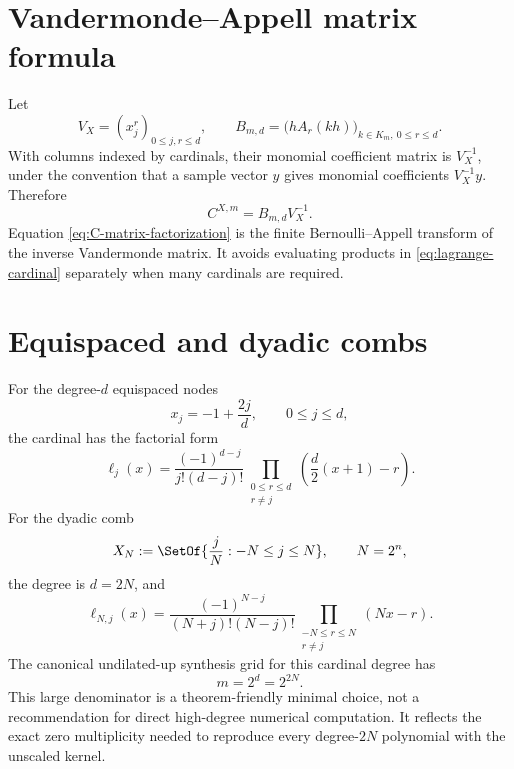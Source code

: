 \documentclass[11pt,oneside]{book}
\theoremstyle{definition}
\theoremstyle{remark}
\begin{document}
\section{Vandermonde--Appell matrix formula}
Let
\begin{equation}
 V_X=(x_j^r)_{0\le j,r\le d},
 \qquad
 B_{m,d}=\bigl(hA_r(kh)\bigr)_{k\in K_m,\ 0\le r\le d}.
 \label{eq:V-B-matrices}
\end{equation}
With columns indexed by cardinals, their monomial coefficient matrix is \(V_X^{-1}\), under the convention that a sample vector \(y\) gives monomial coefficients \(V_X^{-1}y\).  Therefore
\begin{equation}
 C^{X,m}=B_{m,d}V_X^{-1}.
 \label{eq:C-matrix-factorization}
\end{equation}
Equation \cref{eq:C-matrix-factorization} is the finite Bernoulli--Appell transform of the inverse Vandermonde matrix.  It avoids evaluating products in \cref{eq:lagrange-cardinal} separately when many cardinals are required.

\section{Equispaced and dyadic combs}
For the degree-\(d\) equispaced nodes
\[
 x_j=-1+\frac{2j}{d},\qquad 0\le j\le d,
\]
the cardinal has the factorial form
\begin{equation}
 \ell_j(x)=
 \frac{(-1)^{d-j}}{j!(d-j)!}
 \prod_{\substack{0\le r\le d\\r\ne j}}
 \left(\frac d2(x+1)-r\right).
 \label{eq:equispaced-cardinal}
\end{equation}
For the dyadic comb
\begin{equation}
 X_N:=\SetOf{\frac{j}{N}:-N\le j\le N},
 \qquad N=2^n,
 \label{eq:dyadic-comb}
\end{equation}
the degree is \(d=2N\), and
\begin{equation}
 \ell_{N,j}(x)=
 \frac{(-1)^{N-j}}{(N+j)!(N-j)!}
 \prod_{\substack{-N\le r\le N\\r\ne j}}(Nx-r).
 \label{eq:dyadic-cardinal}
\end{equation}
The canonical undilated-up synthesis grid for this cardinal degree has
\begin{equation}
 m=2^d=2^{2N}.
 \label{eq:double-exponential-m}
\end{equation}
This large denominator is a theorem-friendly minimal choice, not a recommendation for direct high-degree numerical computation.  It reflects the exact zero multiplicity needed to reproduce every degree-\(2N\) polynomial with the unscaled kernel.
\end{document}
